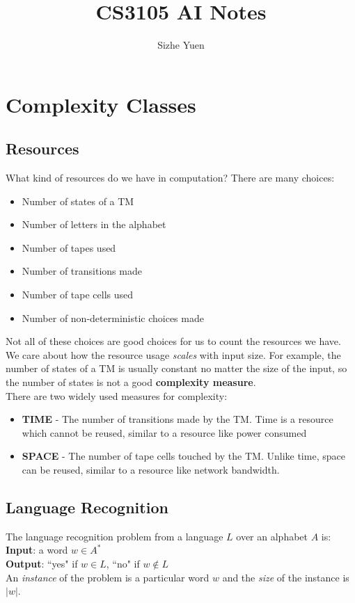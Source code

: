 \documentclass{article}
\title{CS3105 AI Notes}
\author{Sizhe Yuen}
\theoremstyle{definition}
\newcommand{\n}[0]{\\[\baselineskip]}
\begin{document}
\section{Complexity Classes}
\subsection{Resources}
What kind of resources do we have in computation? There are many choices:
\begin{itemize}
\item Number of states of a TM
\item Number of letters in the alphabet
\item Number of tapes used
\item Number of transitions made
\item Number of tape cells used
\item Number of non-deterministic choices made
\end{itemize}
Not all of these choices are good choices for us to count the resources we have. We care about how the resource usage \textit{scales} with input size. For example, the number of states of a TM is usually constant no matter the size of the input, so the number of states is not a good \textbf{complexity measure}.
\n
There are two widely used measures for complexity:
\begin{itemize}
\item \textbf{TIME} - The number of transitions made by the TM. Time is a resource which cannot be reused, similar to a resource like power consumed
\item \textbf{SPACE} - The number of tape cells touched by the TM. Unlike time, space can be reused, similar to a resource like network bandwidth. 
\end{itemize}

\subsection{Language Recognition}
The language recognition problem from a language $L$ over an alphabet $A$ is:
\n
\textbf{Input}: a word $w \in A^*$ \\
\textbf{Output}: ``yes" if $w \in L$, ``no" if $w \not\in L$
\n
An \textit{instance} of the problem is a particular word $w$ and the \textit{size} of the instance is $|w|$.
\end{document}
